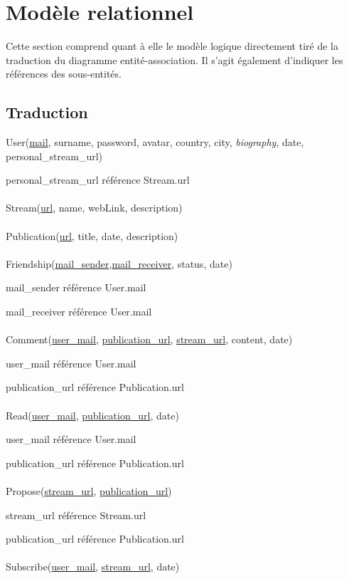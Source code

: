 \documentclass[a4paper,10pt]{article}
\begin{document}
\section{Modèle relationnel}

Cette section comprend quant à elle le modèle logique directement tiré de la traduction du diagramme entité-association. Il s'agit également d'indiquer les références des sous-entités.

\subsection{Traduction}

User(\underline {mail}, surname, password, avatar, country, city, \textsl{biography},  date, personal\_stream\_url)

personal\_stream\_url référence Stream.url
\\\\
Stream(\underline {url}, name, webLink, description)
\\\\
Publication(\underline {url}, title, date, description)
\\\\
Friendship(\underline {mail\_sender},\underline {mail\_receiver}, status, date)

mail\_sender référence User.mail 

mail\_receiver référence User.mail
\\\\
Comment(\underline {user\_mail}, \underline {publication\_url}, \underline {stream\_url}, content, date)

user\_mail référence User.mail

publication\_url référence Publication.url
\\\\
Read(\underline {user\_mail}, \underline {publication\_url}, date)

user\_mail référence User.mail

publication\_url référence Publication.url
\\\\
Propose(\underline {stream\_url}, \underline {publication\_url})

stream\_url référence Stream.url

publication\_url référence Publication.url
\\\\
Subscribe(\underline {user\_mail}, \underline {stream\_url}, date)
\end{document}
